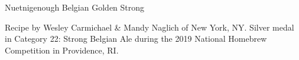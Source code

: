 \stylesection{\stylebelgiangoldenstrongale}

\begin{recipe}{Nuetnigenough Belgian Golden Strong}

\begin{aboutblock}
Recipe by Wesley Carmichael \& Mandy Naglich of New York, NY. Silver medal in
Category 22: Strong Belgian Ale during the 2019 National Homebrew Competition
in Providence, RI. \sourceaha
\end{aboutblock}


\begin{methodandtiming}
 
\begin{mashsteps}
\end{mashsteps}

\begin{fermentationsteps}
\end{fermentationsteps}

\end{methodandtiming}

\recipebreak

\begin{ingredientsblock}

\begin{malts}
\end{malts}

\begin{hops}
\end{hops}


\end{ingredientsblock}

\end{recipe}

